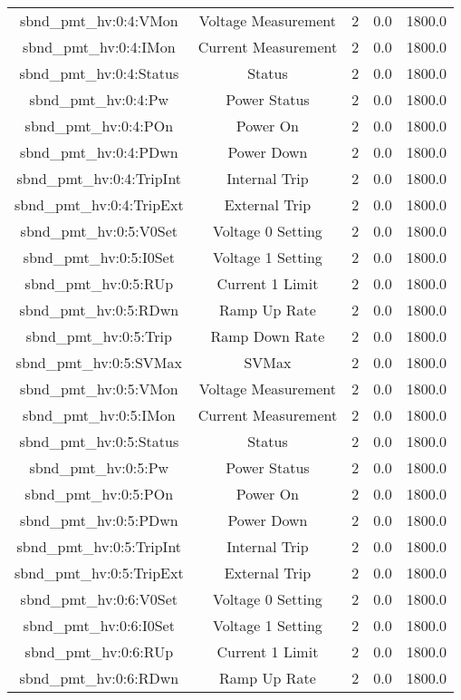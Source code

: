 \begin{center}
\begin{longtable}{c | c c c c }
sbnd\_pmt\_hv:0:4:VMon & Voltage Measurement & 2 & 0.0 & 1800.0\\ 
sbnd\_pmt\_hv:0:4:IMon & Current Measurement & 2 & 0.0 & 1800.0\\ 
sbnd\_pmt\_hv:0:4:Status & Status & 2 & 0.0 & 1800.0\\ 
sbnd\_pmt\_hv:0:4:Pw & Power Status & 2 & 0.0 & 1800.0\\ 
sbnd\_pmt\_hv:0:4:POn & Power On & 2 & 0.0 & 1800.0\\ 
sbnd\_pmt\_hv:0:4:PDwn & Power Down & 2 & 0.0 & 1800.0\\ 
sbnd\_pmt\_hv:0:4:TripInt & Internal Trip & 2 & 0.0 & 1800.0\\ 
sbnd\_pmt\_hv:0:4:TripExt & External Trip & 2 & 0.0 & 1800.0\\ 
sbnd\_pmt\_hv:0:5:V0Set & Voltage 0 Setting & 2 & 0.0 & 1800.0\\ 
sbnd\_pmt\_hv:0:5:I0Set & Voltage 1 Setting & 2 & 0.0 & 1800.0\\ 
sbnd\_pmt\_hv:0:5:RUp & Current 1 Limit & 2 & 0.0 & 1800.0\\ 
sbnd\_pmt\_hv:0:5:RDwn & Ramp Up Rate & 2 & 0.0 & 1800.0\\ 
sbnd\_pmt\_hv:0:5:Trip & Ramp Down Rate & 2 & 0.0 & 1800.0\\ 
sbnd\_pmt\_hv:0:5:SVMax & SVMax & 2 & 0.0 & 1800.0\\ 
sbnd\_pmt\_hv:0:5:VMon & Voltage Measurement & 2 & 0.0 & 1800.0\\ 
sbnd\_pmt\_hv:0:5:IMon & Current Measurement & 2 & 0.0 & 1800.0\\ 
sbnd\_pmt\_hv:0:5:Status & Status & 2 & 0.0 & 1800.0\\ 
sbnd\_pmt\_hv:0:5:Pw & Power Status & 2 & 0.0 & 1800.0\\ 
sbnd\_pmt\_hv:0:5:POn & Power On & 2 & 0.0 & 1800.0\\ 
sbnd\_pmt\_hv:0:5:PDwn & Power Down & 2 & 0.0 & 1800.0\\ 
sbnd\_pmt\_hv:0:5:TripInt & Internal Trip & 2 & 0.0 & 1800.0\\ 
sbnd\_pmt\_hv:0:5:TripExt & External Trip & 2 & 0.0 & 1800.0\\ 
sbnd\_pmt\_hv:0:6:V0Set & Voltage 0 Setting & 2 & 0.0 & 1800.0\\ 
sbnd\_pmt\_hv:0:6:I0Set & Voltage 1 Setting & 2 & 0.0 & 1800.0\\ 
sbnd\_pmt\_hv:0:6:RUp & Current 1 Limit & 2 & 0.0 & 1800.0\\ 
sbnd\_pmt\_hv:0:6:RDwn & Ramp Up Rate & 2 & 0.0 & 1800.0\\ 

\end{longtable}
\end{center}
